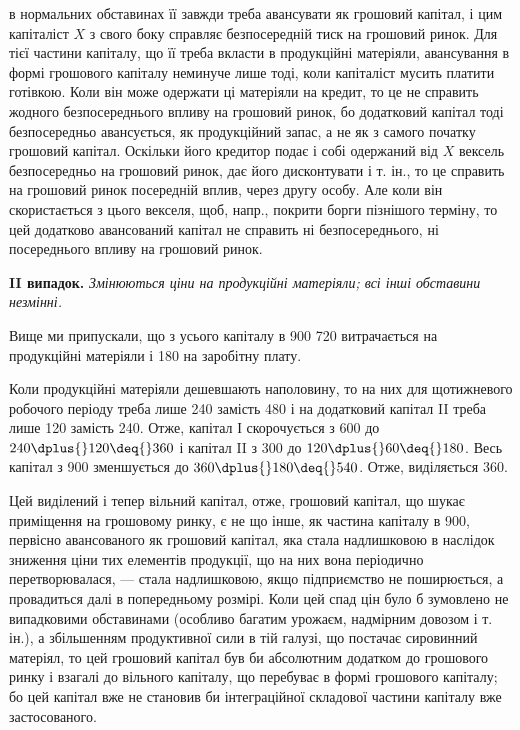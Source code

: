 \parcont{}  %
в нормальних обставинах її завжди треба авансувати як грошовий капітал,
і цим капіталіст $X$ з свого боку справляє безпосередній тиск на грошовий
ринок. Для тієї частини капіталу, що її треба вкласти в продукційні
матеріяли, авансування в формі грошового капіталу неминуче лише
тоді, коли капіталіст мусить платити готівкою. Коли він може одержати
ці матеріяли на кредит, то це не справить жодного безпосереднього
впливу на грошовий ринок, бо додатковий капітал тоді безпосередньо
авансується, як продукційний запас, а не як з самого початку грошовий
капітал. Оскільки його кредитор подає і собі одержаний від $X$ вексель
безпосередньо на грошовий ринок, дає його дисконтувати і т. ін., то це
справить на грошовий ринок посередній вплив, через другу особу. Але
коли він скористається з цього векселя, щоб, напр., покрити борги пізнішого
терміну, то цей додатково авансований капітал не справить ні
безпосереднього, ні посереднього впливу на грошовий ринок.

\textbf{II випадок.} \emph{Змінюються ціни на продукційні матеріяли; всі інші
обставини незмінні.}

Вище ми припускали, що з усього капіталу в 900  \deq{} 720 витрачається на продукційні матеріяли і  \deq{} 180 на заробітну
плату.

Коли продукційні матеріяли дешевшають наполовину, то на них для
щотижневого робочого періоду треба лише 240 замість 480 і на додатковий капітал II треба лише 120 замість
240. Отже, капітал І скорочується з 600 до $240 \dplus{}
120 \deq{} 360$ і капітал II з 300 до $120 \dplus{} 60 \deq{} 180$. Весь капітал з 900 зменшується до $360 \dplus{} 180 \deq{} 540$. Отже, виділяється 360.

Цей виділений і тепер вільний капітал, отже, грошовий капітал, що
шукає приміщення на грошовому ринку, є не що інше, як частина капіталу
в 900, первісно авансованого як грошовий капітал, яка
стала надлишковою в наслідок зниження ціни тих елементів продукції,
що на них вона періодично перетворювалася, — стала надлишковою,
якщо підприємство не поширюється, а провадиться далі в попередньому
розмірі. Коли цей спад цін було б зумовлено не випадковими обставинами
(особливо багатим урожаєм, надмірним довозом і т. ін.), а збільшенням
продуктивної сили в тій галузі, що постачає сировинний матеріял,
то цей грошовий капітал був би абсолютним додатком до грошового
ринку і взагалі до вільного капіталу, що перебуває в формі грошового
капіталу; бо цей капітал вже не становив би інтеграційної складової частини
капіталу вже застосованого.

